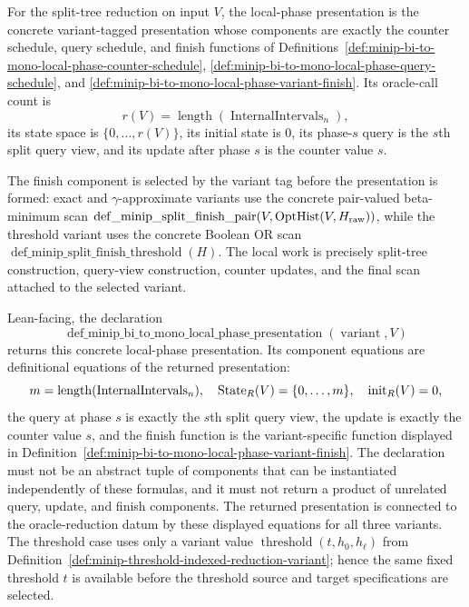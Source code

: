 \begin{definition}
  \label{def:minip-bi-to-mono-local-phase-presentation}
  For the split-tree reduction on input $V$, the local-phase presentation is
  the concrete variant-tagged presentation whose components are exactly the
  counter schedule, query schedule, and finish functions of
  Definitions~\ref{def:minip-bi-to-mono-local-phase-counter-schedule},
  \ref{def:minip-bi-to-mono-local-phase-query-schedule}, and
  \ref{def:minip-bi-to-mono-local-phase-variant-finish}.  Its oracle-call
  count is
  \[
    r(V)=\operatorname{length}(\operatorname{InternalIntervals}_n),
  \]
  its state space is $\{0,\ldots,r(V)\}$, its initial state is $0$, its
  phase-$s$ query is the $s$th split query view, and its update after phase
  $s$ is the counter value $s$.

  The finish component is selected by the variant tag before the presentation
  is formed: exact and $\gamma$-approximate variants use the concrete
  pair-valued beta-minimum scan
  $\operatorname{def\_minip\_split\_finish\_pair}
  (V,\operatorname{OptHist}(V,H_{\rm raw}))$, while the threshold variant uses
  the concrete Boolean OR scan
  $\operatorname{def\_minip\_split\_finish\_threshold}(H)$.  The local work is
  precisely split-tree construction, query-view construction, counter updates,
  and the final scan attached to the selected variant.

  Lean-facing, the declaration
  \[
    \operatorname{def\_minip\_bi\_to\_mono\_local\_phase\_presentation}
      (\operatorname{variant},V)
  \]
  returns this concrete local-phase presentation.  Its component equations are
  definitional equations of the returned presentation:
  \[
    m=\operatorname{length}(\operatorname{InternalIntervals}_n),\quad
    \operatorname{State}_R(V)=\{0,\ldots,m\},\quad
    \operatorname{init}_R(V)=0,
  \]
  the query at phase $s$ is exactly the $s$th split query view, the update is
  exactly the counter value $s$, and the finish function is the
  variant-specific function displayed in
  Definition~\ref{def:minip-bi-to-mono-local-phase-variant-finish}.  The
  declaration must not be an abstract tuple of components that can be
  instantiated independently of these formulas, and it must not return a
  product of unrelated query, update, and finish components.  The returned
  presentation is connected to the oracle-reduction datum by these displayed
  equations for all three variants.  The threshold case uses only a variant
  value $\operatorname{threshold}(t,h_0,h_\ell)$ from
  Definition~\ref{def:minip-threshold-indexed-reduction-variant}; hence the
  same fixed threshold $t$ is available before the threshold source and target
  specifications are selected.
\end{definition}

